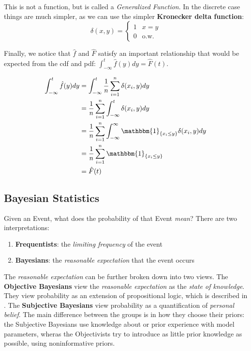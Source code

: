 \documentclass[]{article}
\theoremstyle{mattstyle}
\theoremstyle{definition}
\begin{document}
This is not a function, but is called a \emph{Generalized Function}. In the discrete case things are much simpler, as we can use the simpler \textbf{Kronecker delta function}:
\begin{equation}
	\delta(x,y) = 
	\begin{cases}
		1 & x=y \\
		0 & \text{o.w.}
	\end{cases}
\end{equation}

Finally, we notice that $\hat{f}$ and $\hat{F}$ satisfy an important relationship that would be expected from the cdf and pdf: $\int_{-\infty}^{t}\hat{f}(y)dy = \hat{F}(t)$.

\begin{align*}
\int_{-\infty}^{t}\hat{f}(y)dy &= \int_{-\infty}^{t} \frac{1}{n}\sum_{i=1}^n \delta(x_i, y)dy\\
&= \frac{1}{n}\sum_{i=1}^n \int_{-\infty}^{t}  \delta(x_i, y)dy\\
&= \frac{1}{n}\sum_{i=1}^n \int_{-\infty}^{\infty} \mathbbm{1}_{\{x_i \le y\}} \delta(x_i, y)dy\\
&= \frac{1}{n}\sum_{i=1}^n \mathbbm{1}_{\{x_i \le y\}}\\
&= \hat{F}(t)
\end{align*}

\subsection{Bayesian Statistics}

Given an Event, what does the probability of that Event \emph{mean}? There are two interpretations:

\begin{enumerate}
	\item \textbf{Frequentists}: the \emph{limiting frequency} of the event
	\item \textbf{Bayesians}: the \emph{reasonable expectation} that the event occurs
\end{enumerate}

The \emph{reasonable expectation} can be further broken down into two views. The \textbf{Objective Bayesians} view the \emph{reasonable expectation} as the \emph{state of knowledge}. They view probability as an extension of propositional logic, which is described in \cite{jaynes}. The \textbf{Subjective Bayesians} view probability as a quantification of \emph{personal belief}. The main difference between the groups is in how they choose their priors: the Subjective Bayesians use knowledge about or prior experience with model parameters, wheras the Objectivists try to introduce as little prior knowledge as possible, using noninformative priors.
\end{document}
